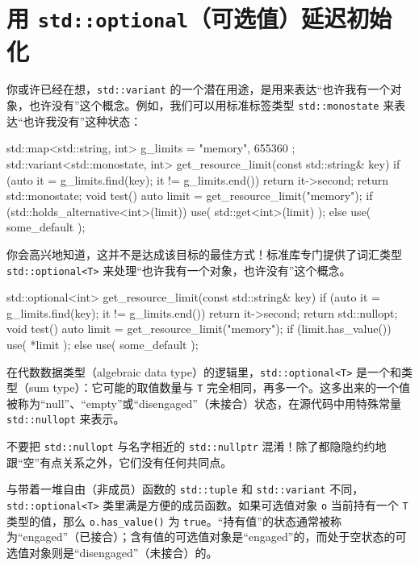 \section{用 \texttt{std::\allowbreak{}optional}（可选值）延迟初始化}

你或许已经在想，\texttt{std::\allowbreak{}variant} 的一个潜在用途，是用来表达“也许我有一个对象，也许没有”这个概念。例如，我们可以用标准标签类型 \texttt{std::\allowbreak{}monostate} 来表达“也许我没有”这种状态：

\begin{codebox}[cpp]
    std::map<std::string, int> g_limits = {
      { "memory", 655360 }
    };
    std::variant<std::monostate, int>
    get_resource_limit(const std::string& key)
    {
      if (auto it = g_limits.find(key); it != g_limits.end()) {
        return it->second;
      }
      return std::monostate{};
    }
    void test()
    {
      auto limit = get_resource_limit("memory");
      if (std::holds_alternative<int>(limit)) {
        use( std::get<int>(limit) );
      } else {
        use( some_default );
      }
    }
\end{codebox}

你会高兴地知道，这并不是达成该目标的最佳方式！标准库专门提供了词汇类型 \texttt{std::\allowbreak{}optional<\allowbreak{}T>\allowbreak{}} 来处理“也许我有一个对象，也许没有”这个概念。

\begin{codebox}[cpp]
    std::optional<int>
    get_resource_limit(const std::string& key)
    {
      if (auto it = g_limits.find(key); it != g_limits.end()) {
        return it->second;
      }
      return std::nullopt;
    }
    void test()
    {
      auto limit = get_resource_limit("memory");
      if (limit.has_value()) {
        use( *limit );
      } else {
        use( some_default );
      }
    }
\end{codebox}

在代数数据类型（algebraic data type）的逻辑里，\texttt{std::\allowbreak{}optional<\allowbreak{}T>\allowbreak{}} 是一个和类型（sum type）：它可能的取值数量与 \texttt{T} 完全相同，再多一个。这多出来的一个值被称为“null”、“empty”或“disengaged”（未接合）状态，在源代码中用特殊常量 \texttt{std::\allowbreak{}nullopt} 来表示。

不要把 \texttt{std::\allowbreak{}nullopt} 与名字相近的 \texttt{std::\allowbreak{}nullptr} 混淆！除了都隐隐约约地跟“空”有点关系之外，它们没有任何共同点。

与带着一堆自由（非成员）函数的 \texttt{std::\allowbreak{}tuple} 和 \texttt{std::\allowbreak{}variant} 不同，\texttt{std::\allowbreak{}optional<\allowbreak{}T>\allowbreak{}} 类里满是方便的成员函数。如果可选值对象 \texttt{o} 当前持有一个 \texttt{T} 类型的值，那么 \texttt{o.\allowbreak{}has\_\allowbreak{}value(\allowbreak{})\allowbreak{}} 为 \texttt{true}。“持有值”的状态通常被称为“engaged”（已接合）；含有值的可选值对象是“engaged”的，而处于空状态的可选值对象则是“disengaged”（未接合）的。

